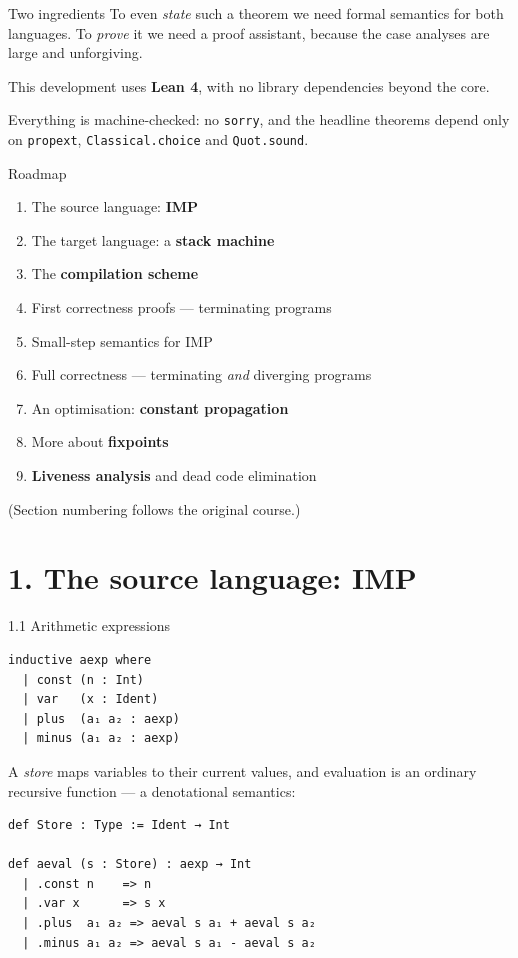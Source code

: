 \documentclass[aspectratio=169,10pt]{beamer}
\newcommand{\code}[1]{\texttt{\small #1}}
\begin{document}
\begin{frame}{Two ingredients}
To even \emph{state} such a theorem we need formal semantics for both
languages.  To \emph{prove} it we need a proof assistant, because the case
analyses are large and unforgiving.
\medskip

This development uses \textbf{Lean 4}, with no library dependencies beyond
the core.
\medskip

Everything is machine-checked: no \code{sorry}, and the headline theorems
depend only on \code{propext}, \code{Classical.choice} and \code{Quot.sound}.
\end{frame}

\begin{frame}{Roadmap}
\begin{enumerate}\setlength{\itemsep}{2pt}
\item The source language: \textbf{IMP}
\item The target language: a \textbf{stack machine}
\item The \textbf{compilation scheme}
\item First correctness proofs --- terminating programs
\item[6.] Small-step semantics for IMP
\item[7.] Full correctness --- terminating \emph{and} diverging programs
\item[8.] An optimisation: \textbf{constant propagation}
\item[9.] More about \textbf{fixpoints}
\item[10.] \textbf{Liveness analysis} and dead code elimination
\end{enumerate}
\medskip
{\small (Section numbering follows the original course.)}
\end{frame}

\section{1. The source language: IMP}

\begin{frame}[fragile]{1.1 Arithmetic expressions}
\begin{lstlisting}
inductive aexp where
  | const (n : Int)
  | var   (x : Ident)
  | plus  (a₁ a₂ : aexp)
  | minus (a₁ a₂ : aexp)
\end{lstlisting}

A \emph{store} maps variables to their current values, and evaluation is an
ordinary recursive function --- a denotational semantics:

\begin{lstlisting}
def Store : Type := Ident → Int

def aeval (s : Store) : aexp → Int
  | .const n    => n
  | .var x      => s x
  | .plus  a₁ a₂ => aeval s a₁ + aeval s a₂
  | .minus a₁ a₂ => aeval s a₁ - aeval s a₂
\end{lstlisting}
\end{frame}
\end{document}
